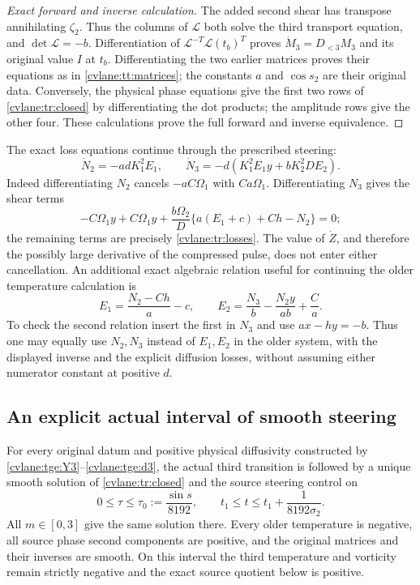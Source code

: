 \begin{proof}[Exact forward and inverse calculation]
The added second shear has transpose annihilating $\zeta_2$.
Thus the columns of $\mathcal L$ both solve the third transport
equation, and $\det\mathcal L=-b$. Differentiation of
$\mathcal L^{-T}\mathcal L(t_b)^T$ proves
$\dot M_3=D_{<3}M_3$ and its original value $I$ at $t_b$.
Differentiating the two earlier matrices proves their equations as
in \eqref{cvlane:tt:matrices}; the constants $a$ and $\cos s_2$ are
their original data. Conversely, the physical phase equations give
the first two rows of \eqref{cvlane:tr:closed} by differentiating the dot
products; the amplitude rows give the other four. These calculations
prove the full forward and inverse equivalence.
\end{proof}

The exact loss equations continue through the prescribed steering:
\begin{equation}\label{cvlane:tr:losses}
 \dot N_2=-adK_1^2E_1,\qquad
 \dot N_3=-d(K_1^2E_1y+bK_2^2DE_2).
\end{equation}
Indeed differentiating $N_2$ cancels $-aC\Omega_1$ with
$Ca\Omega_1$. Differentiating $N_3$ gives the shear terms
\[
 -C\Omega_1y+C\Omega_1y
 +\frac{b\Omega_2}{D}
       \{a(E_1+c)+Ch-N_2\}=0;
\]
the remaining terms are precisely \eqref{cvlane:tr:losses}.
The value of $\dot Z$, and therefore the possibly large derivative
of the compressed pulse, does not enter either cancellation.
An additional exact algebraic relation useful for continuing the
older temperature calculation is
\begin{equation}\label{cvlane:tr:temperature_inverse}
 E_1=\frac{N_2-Ch}{a}-c,\qquad
 E_2=\frac{N_3}{b}-\frac{N_2y}{ab}+\frac Ca.
\end{equation}
To check the second relation insert the first in $N_3$ and use
$ax-hy=-b$. Thus one may equally use $N_2,N_3$ instead of
$E_1,E_2$ in the older system, with the displayed inverse and
the explicit diffusion losses, without assuming either numerator
constant at positive $d$.

\subsection{An explicit actual interval of smooth steering}

\begin{cvlanetheorem}\label{cvlane:tr:local}
For every original datum and positive physical diffusivity constructed
by \eqref{cvlane:tge:Y3}--\eqref{cvlane:tge:d3}, the actual third transition is
followed by a unique smooth solution of \eqref{cvlane:tr:closed} and the
source steering control on
\[
 0\leq\tau\leq\tau_0:=\frac{\sin s}{8192},
 \qquad
 t_1\leq t\leq t_1+\frac1{8192\sigma_2}.
\]
All $m\in[0,3]$ give the same solution there. Every older
temperature is negative, all source phase second components are
positive, and the original matrices and their inverses are smooth.
On this interval the third temperature and vorticity remain strictly
negative and the exact source quotient below is positive.
\end{cvlanetheorem}

